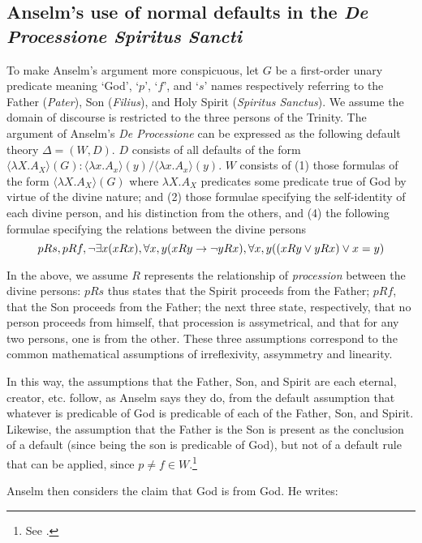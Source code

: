 \documentclass[]{article}
\begin{document}
\subsection{Anselm's use of normal defaults in the \textit{De Processione Spiritus Sancti}}
To make Anselm's argument more conspicuous, let $G$ be a first-order unary predicate meaning `God', `$p$', `$f$', and `$s$' names respectively referring to the Father (\textit{Pater}), Son (\textit{Filius}), and Holy Spirit (\textit{Spiritus Sanctus}). We assume the domain of discourse is restricted to the three persons of the Trinity. The argument of Anselm's \textit{De Processione} can be expressed as the following default theory $\Delta = (W, D)$. $D$ consists of all defaults of the form $\langle\lambda X.A_{X}\rangle(G):  \langle \lambda x.A_{x}\rangle (y) / \langle \lambda x.A_{x}\rangle (y)$. $W$ consists of (1) those formulas of the form $\langle\lambda X.A_{X}\rangle(G)$ where $\lambda X.A_{X}$ predicates some predicate true of God by virtue of the divine nature; and (2) those formulae specifying the self-identity of each divine person, and his distinction from the others, and (4) the following formulae specifying the relations between the divine persons
\begin{displaymath}
pRs, \space pRf, \space \neg \exists x (xRx),\space \forall x, y (xRy \rightarrow \neg yRx), \space \forall x, y ((xRy \vee yRx) \vee x = y) 
\end{displaymath}

In the above, we assume $R$ represents the relationship of \textit{procession} between the divine persons: $pRs$ thus states that the Spirit proceeds from the Father; $pRf$, that the Son proceeds from the Father; the next three state, respectively, that no person proceeds from himself, that procession is assymetrical, and that for any two persons, one is from the other. These three assumptions correspond to the common mathematical assumptions of irreflexivity, assymmetry and linearity.

In this way, the assumptions that the Father, Son, and Spirit are each eternal, creator, etc. follow, as Anselm says they do, from the default assumption that whatever is predicable of God is predicable of each of the Father, Son, and Spirit. Likewise, the assumption that the Father is the Son is present as the conclusion of a default (since being the son is predicable of God), but not of a default rule that can be applied, since $p \ne f \in W$.\footnote{See \cite[470-471]{AnselmDeProc}.}

Anselm then considers the claim that God is from God. He writes: 
\end{document}
